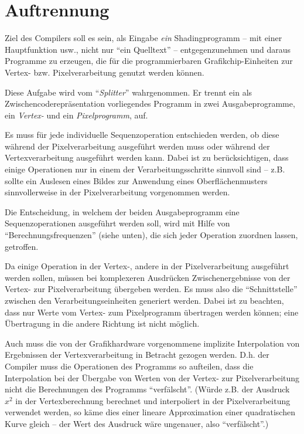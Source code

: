 \documentclass[twoside,a4paper,fleqn,12pt]{book}
\begin{document}
\newpage
\section{Auftrennung}
\label{Auftrennung}

Ziel des Compilers soll es sein, als Eingabe \emph{ein} Shadingprogramm -- mit einer Hauptfunktion usw., nicht nur "`ein Quelltext"' -- entgegenzunehmen
und daraus Programme zu erzeugen, die für die programmierbaren Grafikchip-Einheiten zur Vertex- bzw. Pixelverarbeitung genutzt werden können.

Diese Aufgabe wird vom "`\emph{Splitter}"' wahrgenommen.
Er trennt ein als Zwischencoderepräsentation vorliegendes Programm in zwei Ausgabeprogramme, ein \emph{Vertex-} und ein \emph{Pixelprogramm}, auf.



Es muss für jede individuelle Sequenzoperation entschieden werden, ob diese während der Pixelverarbeitung ausgeführt werden muss
oder während der Vertexverarbeitung ausgeführt werden kann.
Dabei ist zu berücksichtigen, dass einige Operationen nur in einem der Verarbeitungsschritte sinnvoll sind -- z.B. sollte ein Auslesen
eines Bildes zur Anwendung eines Oberflächenmusters sinnvollerweise in der Pixelverarbeitung vorgenommen werden.

Die Entscheidung, in welchem der beiden Ausgabeprogramm eine Sequenzoperationen ausgeführt werden soll,
wird mit Hilfe von "`Berechnungsfrequenzen"' (siehe unten), die sich jeder Operation zuordnen lassen, getroffen.

Da einige Operation in der Vertex-, andere in der Pixelverarbeitung ausgeführt werden sollen, müssen bei komplexeren
Ausdrücken Zwischenergebnisse von der Vertex- zur Pixelverarbeitung übergeben werden. Es muss also die "`Schnittstelle"'
zwischen den Verarbeitungseinheiten generiert werden.
Dabei ist zu beachten, dass nur Werte vom Vertex- zum Pixelprogramm übertragen werden können; %
eine Übertragung in die andere Richtung ist nicht möglich.

Auch muss die von der Grafikhardware vorgenommene implizite Interpolation von Ergebnissen der Vertexverarbeitung in Betracht
gezogen werden. D.h. der Compiler muss die Operationen des Programms so aufteilen, dass die Interpolation bei der Übergabe
von Werten von der Vertex- zur Pixelverarbeitung nicht die Berechnungen des Programms "`verfälscht"'. (Würde z.B. der Ausdruck 
$x^2$ in der Vertexberechnung berechnet und interpoliert in der Pixelverarbeitung verwendet werden, so käme dies einer
lineare Approximation einer quadratischen Kurve gleich -- der Wert des Ausdruck wäre ungenauer, also "`verfälscht"'.)
\end{document}
